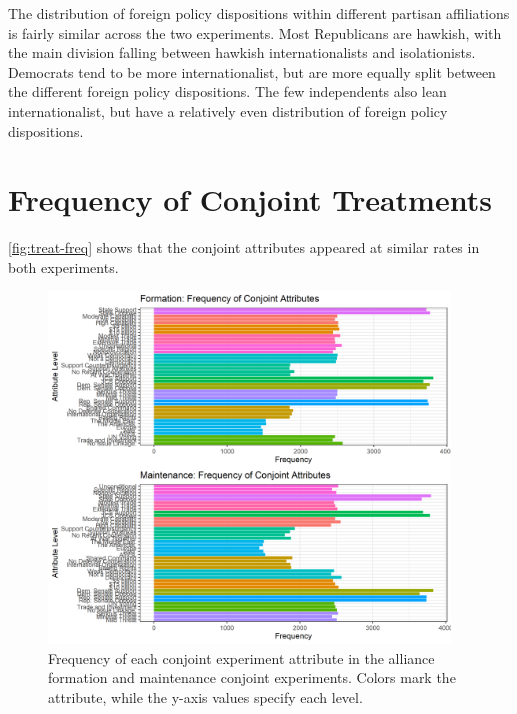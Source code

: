 \documentclass[12pt]{article}
\begin{document}
The distribution of foreign policy dispositions within different partisan affiliations is fairly similar across the two experiments. 
Most Republicans are hawkish, with the main division falling between hawkish internationalists and isolationists. 
Democrats tend to be more internationalist, but are more equally split between the different foreign policy dispositions. 
The few independents also lean internationalist, but have a relatively even distribution of foreign policy dispositions. 



\newpage


\section{Frequency of Conjoint Treatments}

\autoref{fig:treat-freq} shows that the conjoint attributes appeared at similar rates in both experiments. 
 
\begin{figure}[htbp]
	\centering
		\includegraphics[width=0.95\textwidth]{treat-freq.png}
	\caption{Frequency of each conjoint experiment attribute in the alliance formation and maintenance conjoint experiments. Colors mark the attribute, while the y-axis values specify each level.}
	\label{fig:treat-freq}
\end{figure}


\newpage 
 
 
\end{document}
